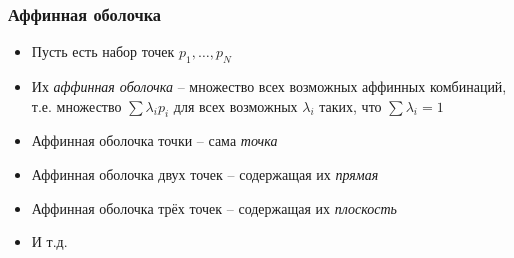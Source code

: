 \documentclass[10pt]{beamer}
\begin{document}
\begin{frame}[fragile]
\frametitle{Аффинная оболочка}
\begin{itemize}
\item Пусть есть набор точек \begin{math}p_1, \dots, p_N\end{math}
\pause
\item Их \textit{аффинная оболочка} -- множество всех возможных аффинных комбинаций, т.е. множество \begin{math}\sum \lambda_i p_i\end{math} для всех возможных \begin{math}\lambda_i\end{math} таких, что \begin{math}\sum \lambda_i = 1\end{math}
\pause
\item Аффинная оболочка точки -- сама \textit{точка}
\pause
\item Аффинная оболочка двух точек -- содержащая их \textit{прямая}
\pause
\item Аффинная оболочка трёх точек -- содержащая их \textit{плоскость}
\pause
\item И т.д.
\end{itemize}
\end{frame}
\end{document}
